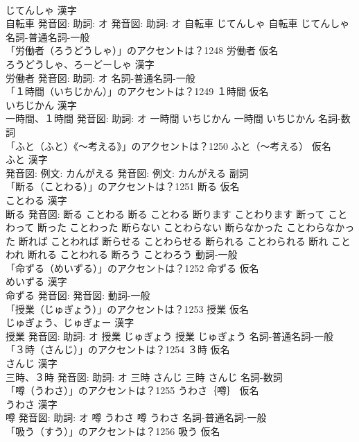 \documentclass[8pt]{extreport}
\begin{document}
\begin{CJK}{UTF8}{min}
\\	じてんしゃ 漢字　
\\	自転車 発音図: 助詞: オ 発音図: 助詞: オ	自転車 じてんしゃ		自転車 じてんしゃ				名詞-普通名詞-一般 
\\	「労働者（ろうどうしゃ）」のアクセントは？1248	労働者 仮名　
\\	ろうどうしゃ、ろーどーしゃ 漢字　
\\	労働者 発音図: 助詞: オ							名詞-普通名詞-一般 
\\	「１時間（いちじかん）」のアクセントは？1249	１時間 仮名　
\\	いちじかん 漢字　
\\	一時間、１時間 発音図: 助詞: オ	一時間 いちじかん		一時間 いちじかん				名詞-数詞 
\\	「ふと（ふと）《〜考える》」のアクセントは？1250	ふと（〜考える） 仮名　
\\	ふと 漢字　
\\	発音図: 例文: カんがえる 発音図: 例文: カんがえる							副詞 
\\	「断る（ことわる）」のアクセントは？1251	断る 仮名　
\\	ことわる 漢字　
\\	断る 発音図:	断る ことわる		断る ことわる 断ります ことわります 断って ことわって 断った ことわった 断らない ことわらない 断らなかった ことわらなかった 断れば ことわれば 断らせる ことわらせる 断られる ことわられる 断れ ことわれ 断れる ことわれる 断ろう ことわろう				動詞-一般 
\\	「命ずる（めいずる）」のアクセントは？1252	命ずる 仮名　
\\	めいずる 漢字　
\\	命ずる 発音図: 発音図:							動詞-一般 
\\	「授業（じゅぎょう）」のアクセントは？1253	授業 仮名　
\\	じゅぎょう、じゅぎょー 漢字　
\\	授業 発音図: 助詞: オ	授業 じゅぎょう		授業 じゅぎょう				名詞-普通名詞-一般 
\\	「３時（さんじ）」のアクセントは？1254	３時 仮名　
\\	さんじ 漢字　
\\	三時、３時 発音図: 助詞: オ	三時 さんじ		三時 さんじ				名詞-数詞 
\\	「噂（うわさ）」のアクセントは？1255	うわさ｛噂｝ 仮名　
\\	うわさ 漢字　
\\	噂 発音図: 助詞: オ	噂 うわさ		噂 うわさ				名詞-普通名詞-一般 
\\	「吸う（すう）」のアクセントは？1256	吸う 仮名　

\end{CJK}
\end{document}
